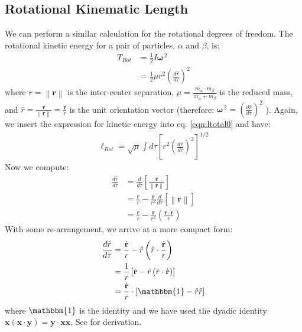 \documentclass[letterpaper,12pt]{article}
\renewcommand{\vec}[1]{\mathbf{#1}}
\newcommand{\norm}[1]{\left\lVert#1\right\rVert}
\renewcommand{\refeq}[1]{eq. \ref{eqn:#1}}
\begin{document}
\subsection{Rotational Kinematic Length}
We can perform a similar calculation for the rotational degrees of freedom. The rotational kinetic energy for a pair of particles, $\alpha$ and $\beta$, is:
\begin{align}
T_{Rot} &= \frac{1}{2}I\vec{\omega}^{\,2} \\
&=\frac{1}{2} \mu r^{2} \left( \frac{d\hat{r}}{d\tau}  \right)^{2}
\end{align}
where $r = \norm{\vec{r}}$ is the inter-center separation,  $\mu = \frac{m_{\alpha} \cdot m_{\beta}}{m_{\alpha}+m_{\beta}}$ is the reduced mass,  and $\hat{r} = \frac{\vec{r}}{\norm{\vec{r}}} = \frac{\vec{r}}{r}$ is the unit orientation vector (therefore: $\vec{\omega}^{\,2} = \left( \frac{d\hat{r}}{d\tau}  \right)^{2}$ ). Again, we insert the expression for kinetic energy into \refeq{ltotal0} and have:
\begin{align}
\ell_{Rot} = \sqrt{\mu} \int d\tau \left[r^{2} \left( \frac{d\hat{r}}{d\tau}  \right)^{2}\right]^{1/2}
\end{align}
Now we compute:
\begin{align}
\frac{d\hat{r}}{d\tau} &= \frac{d}{d\tau} \left[ \frac{\vec{r}}{\norm{\vec{r}}} \right] \\
 &= \frac{\dot{\vec{r}}}{r} - \frac{\vec{r}}{r^2}\frac{d}{d\tau}\left[ \norm{\vec{r}}\right] \\
 &= \frac{\dot{\vec{r}}}{r} - \frac{\vec{r}}{r^2} \left( \frac{\vec{r} \cdot \dot{\vec{r}}}{r}\right)
\end{align}
With some re-arrangement, we arrive at a more compact form:
\begin{align}
\frac{d\hat{r}}{d\tau}  &= \frac{\dot{\vec{r}}}{r} - \hat{r} \left(\hat{r} \cdot \frac{\dot{\vec{r}}}{r}\right) \\
 &= \frac{1}{r} \left[ \dot{\vec{r}} - \hat{r}\left( \hat{r} \cdot \dot{\vec{r}} \right)\right] \\
 &= \frac{\dot{\vec{r}}}{r} \cdot \left[ \mathbbm{1} - \hat{r}\hat{r} \right]
\end{align}
where $\mathbbm{1}$ is the identity and we have used the dyadic identity $\vec{x}(\vec{x}\cdot\vec{y}) = \vec{y}\cdot\vec{x}\vec{x}$. See \cite[2014.05.22:148]{dvcs:labbook1} for derivation.
\end{document}
